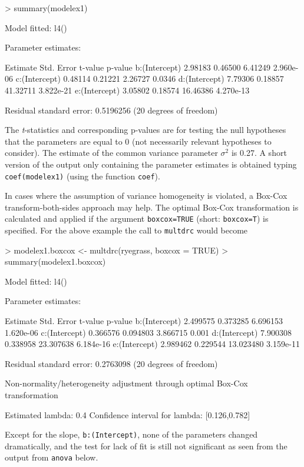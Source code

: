 \documentclass[a4paper]{article}
\begin{document}
\begin{Schunk}
\begin{Sinput}
> summary(modelex1)
\end{Sinput}
\begin{Soutput}
Model fitted: l4()

Parameter estimates:

              Estimate Std. Error  t-value   p-value
b:(Intercept)  2.98183    0.46500  6.41249 2.960e-06
c:(Intercept)  0.48114    0.21221  2.26727    0.0346
d:(Intercept)  7.79306    0.18857 41.32711 3.822e-21
e:(Intercept)  3.05802    0.18574 16.46386 4.270e-13

Residual standard error: 0.5196256 (20 degrees of freedom)
\end{Soutput}
\end{Schunk}
The \emph{t}-statistics and corresponding p-values are for testing the null hypotheses that the parameters are equal to 0 (not
necessarily relevant hypotheses to consider). The estimate of the common variance parameter $\sigma^2$ is 
0.27.
A short version of the output only containing the parameter estimates is obtained typing \verb+coef(modelex1)+ (using the function \verb+coef+).



In cases where the assumption of variance homogeneity is violated, a Box-Cox transform-both-sides approach may help. The optimal
Box-Cox transformation is calculated and applied if the argument \verb+boxcox=TRUE+ (short: \verb+boxcox=T+) is specified. For the
above example the call to \verb+multdrc+ would become

\begin{Schunk}
\begin{Sinput}
> modelex1.boxcox <- multdrc(ryegrass, boxcox = TRUE)
> summary(modelex1.boxcox)
\end{Sinput}
\begin{Soutput}
Model fitted: l4()

Parameter estimates:

               Estimate Std. Error   t-value   p-value
b:(Intercept)  2.499575   0.373285  6.696153 1.620e-06
c:(Intercept)  0.366576   0.094803  3.866715     0.001
d:(Intercept)  7.900308   0.338958 23.307638 6.184e-16
e:(Intercept)  2.989462   0.229544 13.023480 3.159e-11

Residual standard error: 0.2763098 (20 degrees of freedom)

Non-normality/heterogeneity adjustment through optimal Box-Cox transformation

Estimated lambda: 0.4 
Confidence interval for lambda: [0.126,0.782] 
\end{Soutput}
\end{Schunk}
Except for the slope, \verb+b:(Intercept)+, none of the parameters changed dramatically, and the test for lack of fit is still not significant as seen from the
output from \verb+anova+ below.
\end{document}
